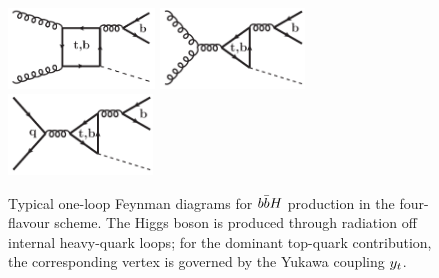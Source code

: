 \documentclass[11pt,a4paper]{article}
\begin{document}
\begin{figure}[b]
\begin{center}
    \includegraphics[height=2.15cm]{./diags/gg-bbH1loop2tb_4F.pdf}\hspace{1.2cm}
    \includegraphics[height=2.15cm]{./diags/gg-bbH1loop5tb.pdf}\hspace{1.2cm}
    \includegraphics[height=2.15cm]{./diags/qq-bbH1loop2tb.pdf}
  \caption{Typical one-loop Feynman diagrams for $b\bar{b}H$ production in the four-flavour scheme. The Higgs boson is produced through radiation off internal heavy-quark loops; for the dominant top-quark contribution, the corresponding vertex is governed by the Yukawa coupling $y_t$.}
  \label{fig:bbhyt}
\end{center}
\end{figure}
\end{document}
